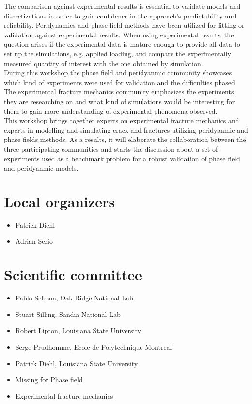 The comparison against experimental results is essential to validate models and discretizations in order to gain confidence in the approach’s predictability and reliability. Peridynamics and phase field methods have been utilized for fitting or validation against experimental results. When using experimental results. the question arises if the experimental data is mature enough to provide all data to set up the simulations, e.g. applied loading, and compare the experimentally measured quantity of interest with the one obtained by simulation. \\

During this workshop the phase field and peridyanmic community showcases which kind of experiments were used for validation and the difficulties phased. The experimental fracture mechanics community emphasizes the experiments they are researching on and what kind of simulations would be interesting for them to gain more understanding of experimental phenomena observed. \\

This workshop brings together experts on experimental fracture mechanics and experts in modelling and simulating crack and fractures utilizing peridyanmic and phase fields methods. As a results, it will elaborate the collaboration between the three participating communities and starts the discussion about a set of experiments used as a benchmark problem for a robust validation of phase field and peridyanmic models.




\section*{Local organizers}
\begin{itemize}
    \item Patrick Diehl
    \item Adrian Serio
\end{itemize}

\section*{Scientific committee}
\begin{itemize}
\item Pablo Seleson, Oak Ridge National Lab
\item Stuart Silling, Sandia National Lab
\item Robert Lipton, Louisiana State University
\item Serge Prudhomme, Ecole de Polytechnique Montreal
\item Patrick Diehl, Louisiana State University
\item Missing for Phase field 
\item Experimental fracture mechanics
\end{itemize}
